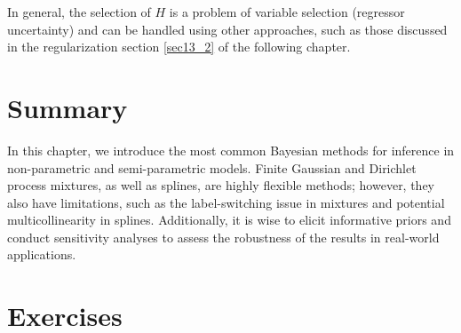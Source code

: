 In general, the selection of $H$ is a problem of variable selection (regressor uncertainty) and can be handled using other approaches, such as those discussed in the regularization section \ref{sec13_2} of the following chapter.

\section{Summary}\label{sec11_3}

In this chapter, we introduce the most common Bayesian methods for inference in non-parametric and semi-parametric models. Finite Gaussian and Dirichlet process mixtures, as well as splines, are highly flexible methods; however, they also have limitations, such as the label-switching issue in mixtures and potential multicollinearity in splines. Additionally, it is wise to elicit informative priors and conduct sensitivity analyses to assess the robustness of the results in real-world applications.

\section{Exercises}\label{sec11_4}

